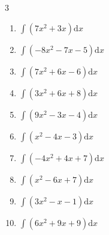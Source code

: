 \begin{multicols}{3}
\begin{enumerate}

\columnbreak %

  \item $\displaystyle \int \left( 7x^{2}+3x \right) \mathrm{d}x$


  \item $\displaystyle \int \left( -8x^{2}-7x-5 \right) \mathrm{d}x$


  \item $\displaystyle \int \left( 7x^{2}+6x-6 \right) \mathrm{d}x$


  \item $\displaystyle \int \left( 3x^{2}+6x+8 \right) \mathrm{d}x$


  \item $\displaystyle \int \left( 9x^{2}-3x-4 \right) \mathrm{d}x$


  \item $\displaystyle \int \left( x^{2}-4x-3 \right) \mathrm{d}x$


  \item $\displaystyle \int \left( -4x^{2}+4x+7 \right) \mathrm{d}x$


  \item $\displaystyle \int \left( x^{2}-6x+7 \right) \mathrm{d}x$


  \item $\displaystyle \int \left( 3x^{2}-x-1 \right) \mathrm{d}x$


  \item $\displaystyle \int \left( 6x^{2}+9x+9 \right) \mathrm{d}x$


\end{enumerate}
\end{multicols}
